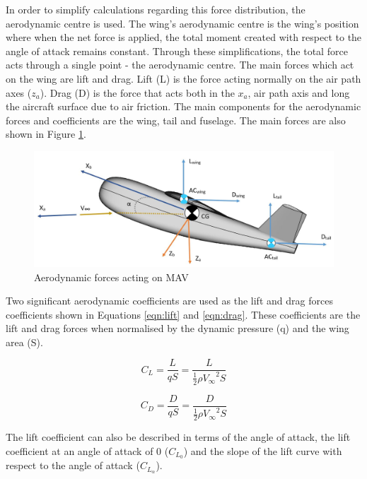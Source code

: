 In order to simplify calculations regarding this force distribution, the aerodynamic centre is used. The wing's aerodynamic centre is the wing's position where when the net force is applied, the total moment created with respect to the angle of attack remains constant. Through these simplifications, the total force acts through a single point - the aerodynamic centre. The main forces which act on the wing are lift and drag. Lift (L) is the force acting normally on the air path axes ($z_a$). Drag (D) is the force that acts both in the $x_a$, air path axis and long the aircraft surface due to air friction. The main components for the aerodynamic forces and coefficients are the wing, tail and fuselage. The main forces are also shown in Figure \ref{fig:aeroforces}.



\begin{figure}[H]
  \centering
  \includegraphics[width=1\linewidth]{03_LiteratureReview/Figs/Aeroforces2.JPG}
  \caption{Aerodynamic forces acting on MAV}
  \label{fig:aeroforces}
\end{figure}
Two significant aerodynamic coefficients are used as the lift and drag forces coefficients shown in Equations \ref{eqn:lift} and \ref{eqn:drag}. These coefficients are the lift and drag forces when normalised by the dynamic pressure (q) and the wing area (S). 


\begin{equation}
    C_L = \frac{L}{qS} = \frac{L}{\frac{1}{2}\rho {V_\infty}^2 S}
    \label{eqn:lift}
\end{equation}

\begin{equation}
     C_D = \frac{D}{qS} = \frac{D}{\frac{1}{2}\rho {V_\infty}^2 S}
     \label{eqn:drag}
\end{equation}

The lift coefficient can also be described in terms of the angle of attack, the lift coefficient at an angle of attack of 0 ($C_{L_0}$) and the slope of the lift curve with respect to the angle of attack ($C_{L_\alpha}$). 

